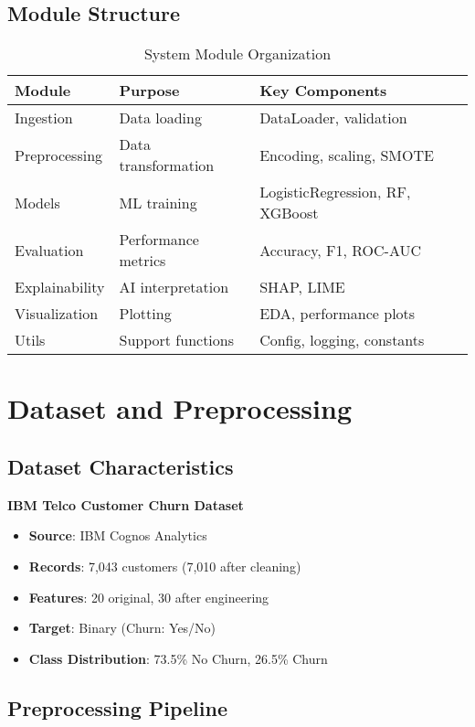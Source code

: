\documentclass[11pt,a4paper]{article}
\begin{document}
\subsection{Module Structure}

\begin{table}[h]
\centering
\begin{tabular}{@{}lll@{}}
\toprule
\textbf{Module} & \textbf{Purpose} & \textbf{Key Components} \\ \midrule
Ingestion & Data loading & DataLoader, validation \\
Preprocessing & Data transformation & Encoding, scaling, SMOTE \\
Models & ML training & LogisticRegression, RF, XGBoost \\
Evaluation & Performance metrics & Accuracy, F1, ROC-AUC \\
Explainability & AI interpretation & SHAP, LIME \\
Visualization & Plotting & EDA, performance plots \\
Utils & Support functions & Config, logging, constants \\ \bottomrule
\end{tabular}
\caption{System Module Organization}
\end{table}

\section{Dataset and Preprocessing}

\subsection{Dataset Characteristics}

\textbf{IBM Telco Customer Churn Dataset}
\begin{itemize}
    \item \textbf{Source}: IBM Cognos Analytics
    \item \textbf{Records}: 7,043 customers (7,010 after cleaning)
    \item \textbf{Features}: 20 original, 30 after engineering
    \item \textbf{Target}: Binary (Churn: Yes/No)
    \item \textbf{Class Distribution}: 73.5\% No Churn, 26.5\% Churn
\end{itemize}

\subsection{Preprocessing Pipeline}
\end{document}
